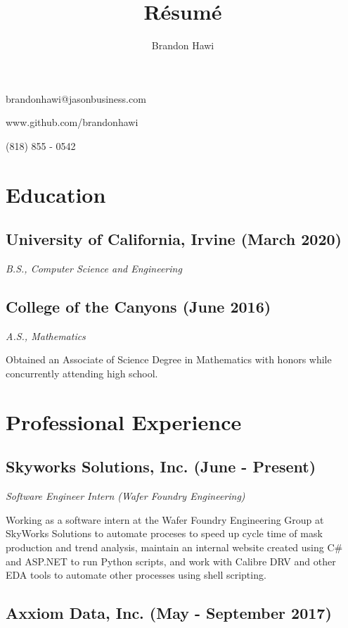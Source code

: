 \documentclass{article}
\makeatletter
\renewcommand{\maketitle}
{
\begin{flushleft}
\huge
\textbf{\theauthor}
\small

brandonhawi@jasonbusiness.com

www.github.com/brandonhawi

(818) 855 - 0542
\end{flushleft}
}
\makeatother
\begin{document}
\title{R\'esum\'e}
\author{Brandon Hawi}

\maketitle
\vspace{-0.1in}
\section{Education}

\subsection{University of California, Irvine (March 2020)}
\noindent\textit{B.S., Computer Science and Engineering}

\subsection{College of the Canyons (June 2016)}
\noindent\textit{A.S., Mathematics}

Obtained an Associate of Science Degree in Mathematics with honors while concurrently attending
high school.

\section{Professional Experience}

%
%
%

\subsection{Skyworks Solutions, Inc. (June - Present)}

\noindent\textit{Software Engineer Intern (Wafer Foundry Engineering)}

Working as a software intern at the Wafer Foundry Engineering Group at SkyWorks Solutions to 
automate proceses to speed up cycle time of mask production and trend analysis, maintain an internal website 
created using C\# and ASP.NET to run Python scripts, and work with Calibre DRV and other EDA tools to 
automate other processes using shell scripting.

\subsection{Axxiom Data, Inc. (May - September 2017)}
\end{document}
